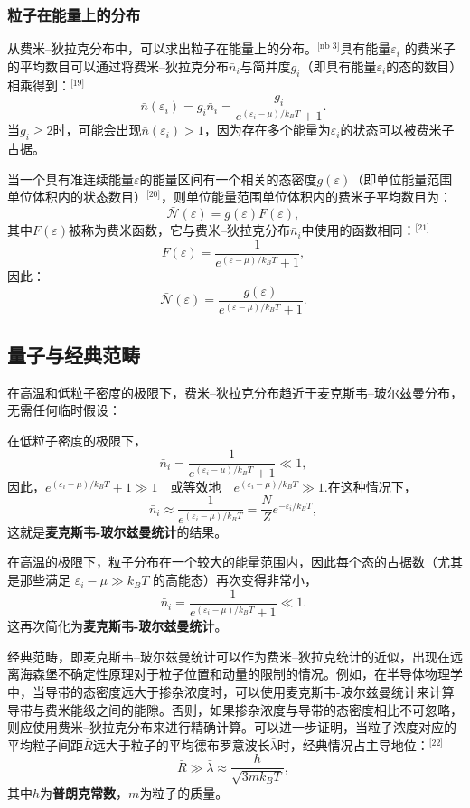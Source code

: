 \subsubsection{粒子在能量上的分布}
从费米–狄拉克分布中，可以求出粒子在能量上的分布。\(^\text{[nb 3]}\)具有能量\( \varepsilon_i\) 的费米子的平均数目可以通过将费米–狄拉克分布\(\bar{n}_i\)与简并度\(g_i\)（即具有能量\(\varepsilon_i\)的态的数目）相乘得到：\(^\text{[19]}\) 
\[
\bar{n}(\varepsilon_i) = g_i \bar{n}_i = \frac{g_i}{e^{(\varepsilon_i - \mu) / k_B T} + 1}.~
\]
当\( g_i \geq 2 \)时，可能会出现\( \bar{n}(\varepsilon_i) > 1 \)，因为存在多个能量为\( \varepsilon_i \)的状态可以被费米子占据。

当一个具有准连续能量\(\varepsilon\)的能量区间有一个相关的态密度\( g(\varepsilon)\)（即单位能量范围单位体积内的状态数目）\(^\text{[20]}\)，则单位能量范围单位体积内的费米子平均数目为：
\[
\bar{\mathcal{N}}(\varepsilon) = g(\varepsilon) F(\varepsilon),~
\]
其中\(F(\varepsilon)\)被称为费米函数，它与费米–狄拉克分布\(\bar{n}_i\)中使用的函数相同：\(^\text{[21]}\)
\[
F(\varepsilon) = \frac{1}{e^{(\varepsilon - \mu) / k_B T} + 1},~
\]
因此：
\[
\bar{\mathcal{N}}(\varepsilon) = \frac{g(\varepsilon)}{e^{(\varepsilon - \mu) / k_B T} + 1}.~
\]
\subsection{量子与经典范畴}
在高温和低粒子密度的极限下，费米–狄拉克分布趋近于麦克斯韦–玻尔兹曼分布，无需任何临时假设：

在低粒子密度的极限下，\[\bar{n}_i = \frac{1}{e^{(\varepsilon_i - \mu) / k_B T} + 1} \ll 1,~\]因此，\(e^{(\varepsilon_i - \mu) / k_B T} + 1 \gg 1 \quad \text{或等效地} \quad e^{(\varepsilon_i - \mu) / k_B T} \gg 1\).在这种情况下，\[\bar{n}_i \approx \frac{1}{e^{(\varepsilon_i - \mu) / k_B T}} = \frac{N}{Z} e^{-\varepsilon_i / k_B T},~\]这就是\textbf{麦克斯韦-玻尔兹曼统计}的结果。

在高温的极限下，粒子分布在一个较大的能量范围内，因此每个态的占据数（尤其是那些满足 \( \varepsilon_i - \mu \gg k_B T \) 的高能态）再次变得非常小，\[\bar{n}_i = \frac{1}{e^{(\varepsilon_i - \mu) / k_B T} + 1} \ll 1.~\]这再次简化为\textbf{麦克斯韦-玻尔兹曼统计}。

经典范畴，即麦克斯韦–玻尔兹曼统计可以作为费米–狄拉克统计的近似，出现在远离海森堡不确定性原理对于粒子位置和动量的限制的情况。例如，在半导体物理学中，当导带的态密度远大于掺杂浓度时，可以使用麦克斯韦-玻尔兹曼统计来计算导带与费米能级之间的能隙。否则，如果掺杂浓度与导带的态密度相比不可忽略，则应使用费米–狄拉克分布来进行精确计算。可以进一步证明，当粒子浓度对应的平均粒子间距\( \bar{R} \)远大于粒子的平均德布罗意波长\( \bar{\lambda} \)时，经典情况占主导地位：\(^\text{[22]}\)  
\[
\bar{R} \gg \bar{\lambda} \approx \frac{h}{\sqrt{3mk_B T}},~
\]
其中\( h \)为\textbf{普朗克常数}，\( m \)为粒子的质量。

